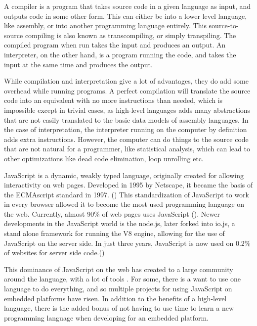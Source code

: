 A compiler is a program that takes source code in a given language as input, and outputs code in some other form. 
This can either be into a lower level language, like assembly, or into another programming language entirely.
This source-to-source compiling is also known as transcompiling, or simply transpiling.
The compiled program when run takes the input and produces an output. 
An interpreter, on the other hand, is a program running the code, and takes the input at the same time and produces the output.

While compilation and interpretation give a lot of advantages, they do add some overhead while running programs. 
A perfect compilation will translate the source code into an equivalent with no more instructions than needed, which is impossible except in trivial cases, as high-level languages adds many abstractions that are not easily translated to the basic data models of assembly languages. 
In the case of interpretation, the interpreter running on the computer by definition adds extra instructions. 
However, the computer can do things to the source code that are not natural for a programmer, like statistical analysis, which can lead to other optimizations like dead code elimination, loop unrolling etc.

JavaScript is a dynamic, weakly typed language, originally created for allowing interactivity on web pages.
Developed in 1995 by Netscape, it became the basis of the ECMAscript standard in 1997. (\cite{jshistory})
This standardization of JavaScript to work in every browser allowed it to become the most used programming language on the web.
Currently, almost 90\% of web pages uses JavaScript (\cite{jsclientstats}).
Newer developments in the JavaScript world is the node.js, later forked into io.js, a stand alone framework for running the V8 engine, allowing for the use of JavaScript on the server side.
In just three years, JavaScript is now used on 0.2\% of websites for server side code.(\cite{jsserverstats})

This dominance of JavaScript on the web has created to a large community around the language, with a lot of tools .
For some, there is a want to use one language to do everything, and so multiple projects for using JavaScript on embedded platforms have risen.
In addition to the benefits of a high-level language, there is the added bonus of not having to use time to learn a new programming language when developing for an embedded platform.



